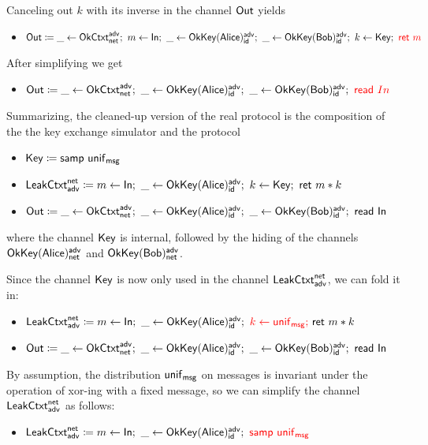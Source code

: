 \noindent Canceling out $k$ with its inverse in the channel $\Out$ yields
\begin{itemize}
\item $\Out \coloneqq \_ \leftarrow \OkCtxt^\adv_\net; \ m \leftarrow \In; \ \_ \leftarrow \OkKey(\Alice)^\adv_\id; \ \_ \leftarrow \OkKey(\Bob)^\adv_\id; \ k \leftarrow \Key; \ {\color{red} \ret{m}}$
\end{itemize}
After simplifying we get
\begin{itemize}
\item $\Out \coloneqq \_ \leftarrow \OkCtxt^\adv_\net; \ \_ \leftarrow \OkKey(\Alice)^\adv_\id; \ \_ \leftarrow \OkKey(\Bob)^\adv_\id; \ {\color{red} \read{In}}$
\end{itemize}

\noindent Summarizing, the cleaned-up version of the real protocol is the composition of the the key exchange simulator and the protocol
\begin{itemize}
\item $\Key \coloneqq \samp{\unif_\msg}$
\item $\LeakCtxt^\net_\adv \coloneqq m \leftarrow \In; \ \_ \leftarrow \OkKey(\Alice)^\adv_\id; \ k \leftarrow \Key; \ \ret{m * k}$
\item $\Out \coloneqq \_ \leftarrow \OkCtxt^\adv_\net; \ \_ \leftarrow \OkKey(\Alice)^\adv_\id; \ \_ \leftarrow \OkKey(\Bob)^\adv_\id; \ \read{\In}$
\end{itemize}
where the channel $\Key$ is internal, followed by the hiding of the channels $\OkKey(\Alice)^\adv_\net$ and $\OkKey(\Bob)^\adv_\net$.

Since the channel $\Key$ is now only used in the channel $\LeakCtxt^\net_\adv$, we can fold it in:
\begin{itemize}
\item $\LeakCtxt^\net_\adv \coloneqq m \leftarrow \In; \ \_ \leftarrow \OkKey(\Alice)^\adv_\id; \ {\color{red} k \leftarrow \unif_\msg; \ } \ret{m * k}$
\item $\Out \coloneqq \_ \leftarrow \OkCtxt^\adv_\net; \ \_ \leftarrow \OkKey(\Alice)^\adv_\id; \ \_ \leftarrow \OkKey(\Bob)^\adv_\id; \ \read{\In}$
\end{itemize}

\noindent By assumption, the distribution $\unif_\msg$ on messages is invariant under the operation of xor-ing with a fixed message, so we can simplify the channel $\LeakCtxt^\net_\adv$ as follows:
\begin{itemize}
\item $\LeakCtxt^\net_\adv \coloneqq m \leftarrow \In; \ \_ \leftarrow \OkKey(\Alice)^\adv_\id; \ {\color{red} \samp{\unif_\msg}}$
\end{itemize}

